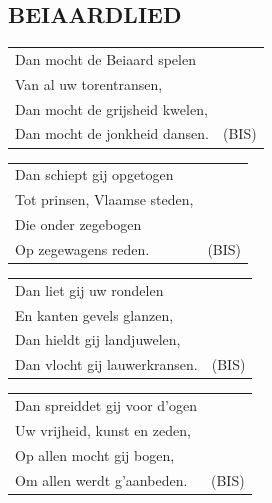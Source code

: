 \documentclass{article}
\begin{document}
\subsection*{BEIAARDLIED}
\begin{flushleft}
\begin{tabularx}{0.8\textwidth} {
   >{\raggedright\arraybackslash}X c}
   Dan mocht de Beiaard spelen\\
Van al uw torentransen,\\
Dan mocht de grijsheid kwelen,\\
Dan mocht de jonkheid dansen. & (BIS)\\
\end{tabularx}
\end{flushleft}\begin{flushleft}
\begin{tabularx}{0.8\textwidth} {
   >{\raggedright\arraybackslash}X c}
   Dan schiept gij opgetogen\\
Tot prinsen, Vlaamse steden,\\
Die onder zegebogen\\
Op zegewagens reden. & (BIS)\\
\end{tabularx}
\end{flushleft}\begin{flushleft}
\begin{tabularx}{0.8\textwidth} {
   >{\raggedright\arraybackslash}X c }
   Dan liet gij uw rondelen\\
En kanten gevels glanzen,\\
Dan hieldt gij landjuwelen,\\
Dan vlocht gij lauwerkransen. & (BIS)\\
\end{tabularx}
\end{flushleft}\begin{flushleft}
\begin{tabularx}{0.8\textwidth} {
   >{\raggedright\arraybackslash}X c}
   Dan spreiddet gij voor d’ogen\\
Uw vrijheid, kunst en zeden,\\
Op allen mocht gij bogen,\\
Om allen werdt g’aanbeden. & (BIS)\\
\end{tabularx}
\end{flushleft}
\end{document}
